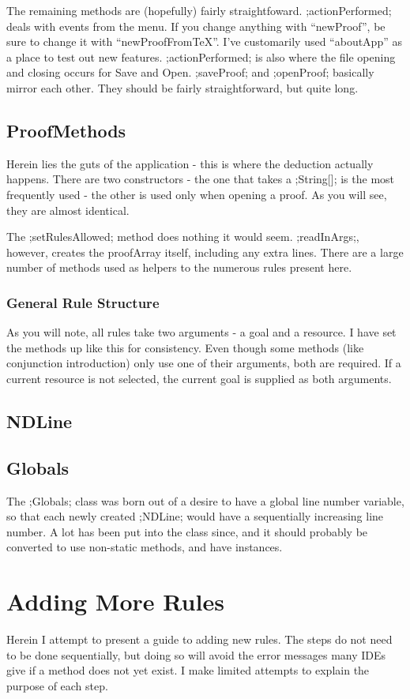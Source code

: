 \documentclass[a4paper]{article}
\begin{document}
The remaining methods are (hopefully) fairly straightfoward. ;actionPerformed; deals with events from the menu. If you change anything with ``newProof'', be sure to change it with ``newProofFromTeX''. I've customarily used ``aboutApp'' as a place to test out new features. ;actionPerformed; is also where the file opening and closing occurs for Save and Open. ;saveProof; and ;openProof; basically mirror each other. They should be fairly straightforward, but quite long.

\subsection{ProofMethods}
Herein lies the guts of the application - this is where the deduction actually happens. There are two constructors - the one that takes a ;String[]; is the most frequently used - the other is used only when opening a proof. As you will see, they are almost identical.

The ;setRulesAllowed; method does nothing it would seem. ;readInArgs;, however, creates the proofArray itself, including any extra lines. There are a large number of methods used as helpers to the numerous rules present here.

\subsubsection{General Rule Structure}
As you will note, all rules take two arguments - a goal and a resource. I have set the methods up like this for consistency. Even though some methods (like conjunction introduction) only use one of their arguments, both are required. If a current resource is not selected, the current goal is supplied as both arguments.


\subsection{NDLine}

\subsection{Globals}
The ;Globals; class was born out of a desire to have a global line number variable, so that each newly created ;NDLine; would have a sequentially increasing line number. A lot has been put into the class since, and it should probably be converted to use non-static methods, and have instances.

\section{Adding More Rules}
Herein I attempt to present a guide to adding new rules. The steps do not need to be done sequentially, but doing so will avoid the error messages many IDEs give if a method does not yet exist. I make limited attempts to explain the purpose of each step.
\end{document}
